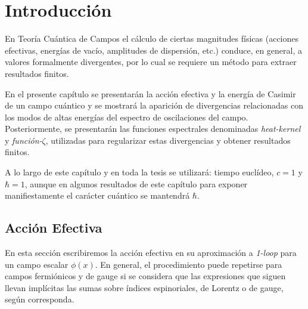 \chapter{Introducción}


En Teoría Cuántica de Campos el cálculo de ciertas magnitudes físicas (acciones efectivas, energías de vacío, amplitudes de dispersión, etc.) conduce, en general, a valores formalmente divergentes, por lo cual se requiere un método para extraer resultados finitos. 

En el presente capítulo se presentarán la acción efectiva y la energía de Casimir de un campo cuántico y se mostrará la aparición de divergencias relacionadas con los modos de altas energías del espectro de oscilaciones del campo. Posteriormente, se presentarán las funciones espectrales denominadas {\it heat-kernel} y {\it función-$\zeta$}, utilizadas para regularizar estas divergencias y obtener resultados finitos.

A lo largo de este capítulo y en toda la tesis se utilizará: tiempo euclídeo, $c=1$ y $\hbar =1$, aunque en algunos resultados de este capítulo para exponer manifiestamente el carácter cuántico se mantendrá $\hbar$.

\section{Acción Efectiva}\label{accion_efectiva}

En esta sección escribiremos la acción efectiva en su aproximación a {\it 1-loop} para un campo escalar $\phi(x)$. En general, el procedimiento puede repetirse para campos fermiónicos y de gauge si se considera que las expresiones que siguen llevan implícitas las sumas sobre índices espinoriales, de Lorentz o de gauge, según corresponda.

